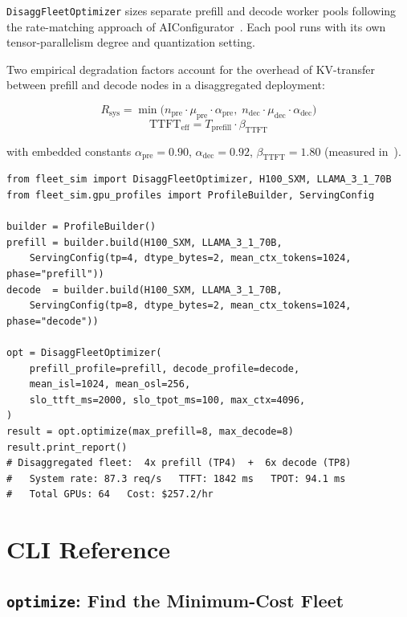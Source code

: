 \documentclass[11pt,a4paper]{article}
\begin{document}
\texttt{DisaggFleetOptimizer} sizes separate prefill and decode worker pools
following the rate-matching approach of
AIConfigurator~\citep{xu2025aiconfigurator}.  Each pool runs with its own
tensor-parallelism degree and quantization setting.

Two empirical degradation factors account for the overhead of
KV-transfer between prefill and decode nodes in a disaggregated deployment:

\[
  R_{\text{sys}} = \min\!\bigl(
    n_{\text{pre}} \cdot \mu_{\text{pre}} \cdot \alpha_{\text{pre}},\;
    n_{\text{dec}} \cdot \mu_{\text{dec}} \cdot \alpha_{\text{dec}}
  \bigr)
\]
\[
  \text{TTFT}_{\text{eff}} = T_{\text{prefill}} \cdot \beta_{\text{TTFT}}
\]

\noindent
with embedded constants $\alpha_{\text{pre}} = 0.90$,
$\alpha_{\text{dec}} = 0.92$, $\beta_{\text{TTFT}} = 1.80$
(measured in~\citealt{xu2025aiconfigurator}).

\begin{lstlisting}[style=python]
from fleet_sim import DisaggFleetOptimizer, H100_SXM, LLAMA_3_1_70B
from fleet_sim.gpu_profiles import ProfileBuilder, ServingConfig

builder = ProfileBuilder()
prefill = builder.build(H100_SXM, LLAMA_3_1_70B,
    ServingConfig(tp=4, dtype_bytes=2, mean_ctx_tokens=1024, phase="prefill"))
decode  = builder.build(H100_SXM, LLAMA_3_1_70B,
    ServingConfig(tp=8, dtype_bytes=2, mean_ctx_tokens=1024, phase="decode"))

opt = DisaggFleetOptimizer(
    prefill_profile=prefill, decode_profile=decode,
    mean_isl=1024, mean_osl=256,
    slo_ttft_ms=2000, slo_tpot_ms=100, max_ctx=4096,
)
result = opt.optimize(max_prefill=8, max_decode=8)
result.print_report()
# Disaggregated fleet:  4x prefill (TP4)  +  6x decode (TP8)
#   System rate: 87.3 req/s   TTFT: 1842 ms   TPOT: 94.1 ms
#   Total GPUs: 64   Cost: $257.2/hr
\end{lstlisting}

\section{CLI Reference}
\label{sec:cli}

\subsection{\texttt{optimize}: Find the Minimum-Cost Fleet}
\end{document}
